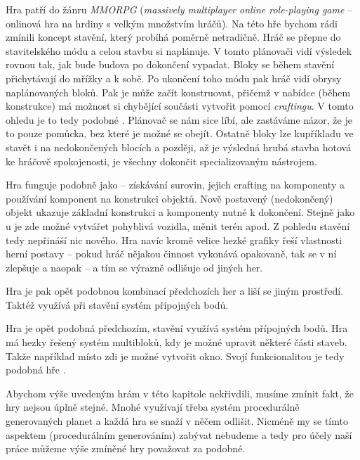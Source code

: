 Hra \NI{} patří do žánru \textit{MMORPG} (\textit{massively multiplayer online role-playing game} -- onlinová hra na hrdiny s velkým množstvím hráčů). Na této hře bychom rádi zmínili koncept stavění, který probíhá poměrně netradičně. Hráč se přepne do stavitelského módu a celou stavbu si naplánuje. V tomto plánovači vidí výsledek rovnou tak, jak bude budova po dokončení vypadat. Bloky se během stavění přichytávají do mřížky a k sobě. Po ukončení toho módu pak hráč vidí obrysy naplánovaných bloků. Pak je může začít konstruovat, přičemž v nabídce (během konstrukce) má možnost si chybějící součásti vytvořit pomocí \textit{craftingu}. V tomto ohledu je to tedy podobné \SE{}. Plánovač se nám sice líbí, ale zastáváme názor, že je to pouze pomůcka, bez které je možné se obejít. Ostatně bloky lze kupříkladu ve \SE{} stavět i na nedokončených blocích a později, až je výsledná hrubá stavba hotová ke hráčově spokojenosti, je všechny dokončit specializovaným nástrojem.


Hra \PN{} funguje podobně jako \SE{} -- získávání surovin, jejich crafting na komponenty a používání komponent na konstrukci objektů. Nově postavený (nedokončený) objekt ukazuje základní konstrukci a komponenty nutné k dokončení. Stejně jako u \SE{} je zde možné vytvářet pohyblivá vozidla, měnit terén apod. Z pohledu stavění tedy nepřináší nic nového. Hra navíc kromě velice hezké grafiky řeší vlastnosti herní postavy -- pokud hráč nějakou činnost vykonává opakovaně, tak se v ní zlepšuje a naopak -- a tím se výrazně odlišuje od jiných her.


Hra \ARK{} je pak opět podobnou kombinací předchozích her a liší se jiným prostředí. Taktéž využívá při stavění systém přípojných bodů.

Hra \NMS{} je opět podobná předchozím, stavění využívá systém přípojných bodů. Hra má hezky řešený systém multibloků, kdy je možné upravit některé části staveb. Takže například místo zdi je možné vytvořit okno. Svojí funkcionalitou je tedy podobná hře \SE{}.

Abychom výše uvedeným hrám v této kapitole nekřivdili, musíme zmínit fakt, že hry nejsou úplně stejné. Mnohé využívají třeba systém procedurálně generovaných planet a každá hra se snaží v něčem odlišit. Nicméně my se tímto aspektem (procedurálním generováním) zabývat nebudeme a tedy pro účely naší práce můžeme výše zmíněné hry považovat za podobné.

